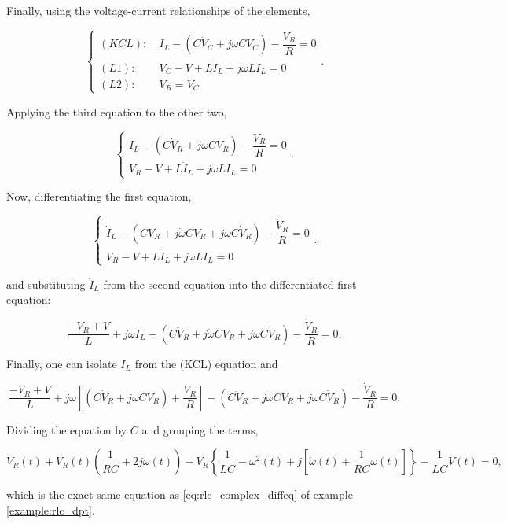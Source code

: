 \begin{example}
	Finally, using the voltage-current relationships of the elements,

\begin{equation}\left\{\begin{array}{rl} (KCL):&\ I_L - \left(C\dot{V}_C + j\omega C V_C\right) - \dfrac{V_R}{R} = 0 \\[3mm] (L1):&\ V_C - V + L\dot{I}_L + j\omega LI_L = 0 \\[3mm] (L2):&\ V_R = V_C \end{array}\right. .\end{equation}

	Applying the third equation to the other two,

\begin{equation}\left\{\begin{array}{l} I_L - \left(C\dot{V}_R + j\omega C V_R\right) - \dfrac{V_R}{R} = 0 \\[3mm] V_R - V + L\dot{I}_L + j\omega LI_L = 0 \end{array}\right. .\end{equation}

	Now, differentiating the first equation, 

\begin{equation}\left\{\begin{array}{l} \dot{I}_L - \left(C\ddot{V}_R + j\dot{\omega} C V_R + j\omega C \dot{V}_R\right) - \dfrac{\dot{V}_R}{R} = 0 \\[3mm] V_R - V + L\dot{I}_L + j\omega LI_L = 0 \end{array}\right. .\end{equation}

	\noindent and substituting $\dot{I}_L$ from the second equation into the differentiated first equation:

\begin{equation}\dfrac{-V_R + V}{L} + j\omega I_L - \left(C\ddot{V}_R + j\dot{\omega} C V_R + j\omega C \dot{V}_R\right) - \dfrac{\dot{V}_R}{R} = 0 .\end{equation}

	Finally, one can isolate $I_L$ from the (KCL) equation and

\begin{equation}\dfrac{-V_R + V}{L} + j\omega \left[\left(C\dot{V}_R + j\omega C V_R\right) + \dfrac{V_R}{R}\right] - \left(C\ddot{V}_R + j\dot{\omega} C V_R + j\omega C \dot{V}_R\right) - \dfrac{\dot{V}_R}{R} = 0 .\end{equation}

	Dividing the equation by $C$ and grouping the terms, 

\begin{equation} \ddot{V}_R(t) + \dot{V}_R(t)\left(\dfrac{1}{RC} + 2j\omega(t)\right) + V_R\left\{ \dfrac{1}{LC}  -\omega^2(t) + j \left[ \dot{\omega}(t) + \dfrac{1}{RC}\omega(t)\right]\right\} -\dfrac{1}{LC} V(t) = 0, \label{eq:rlc_complex_diffeq_dpt}\end{equation}

	\noindent which is the exact same equation as \eqref{eq:rlc_complex_diffeq} of example \ref{example:rlc_dpt}.

\examplebar
\end{example} %

